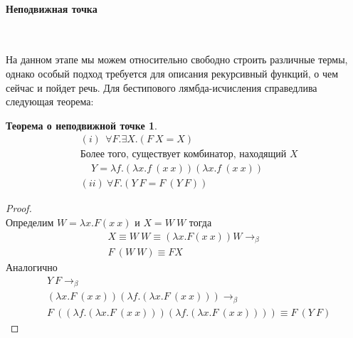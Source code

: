 \documentclass[lambda.tex]{subfiles}
\begin{document}

\paragraph{Неподвижная точка} %
\label{par:fix point}
~\\

\begin{tcolorbox}
На данном этапе мы можем относительно свободно строить различные термы, однако особый подход требуется для описания рекурсивный функций, о чем сейчас и пойдет речь. Для бестипового лямбда-исчисления справедлива следующая теорема:
\newtheorem*{fixpoint}{Теорема о неподвижной точке}
\begin{fixpoint}
\begin{align*}
&(i)\ \ \forall F. \exists X. (F\ X = X) \\
&\text{Более того, существует комбинатор, находящий $X$}\\
&\ \ \ \ \ Y = \lambda f.(\lambda x.f\ (x\ x)) (\lambda x.f\ (x\ x))\\
&(ii)\ \forall F.(Y\ F=F\ (Y\ F))
\end{align*}
\end{fixpoint}

\begin{proof}
~\\
Определим $W = \lambda x.F(x\ x)$ и $X = W\ W$ тогда
\begin{align*}
X \equiv W\ W \equiv (\lambda x.F(x\ x))W \rightarrow_\beta\\
F\ (W\ W) \equiv F X
\end{align*}
Аналогично
\begin{align*}
&Y\ F \rightarrow_\beta\\
&(\lambda x.F\ (x\ x)) (\lambda f.(\lambda x.F\ (x\ x))) \rightarrow_\beta\\
&F\ ((\lambda f.(\lambda x.F\ (x\ x))) (\lambda f.(\lambda x.F\ (x\ x)))) \equiv F\ (Y\ F)
\end{align*}
\end{proof}


\end{tcolorbox}
\end{document}
